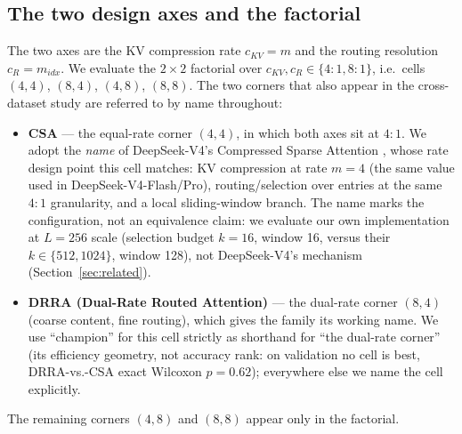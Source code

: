 \subsection{The two design axes and the factorial}
\label{sec:factorial}
The two axes are the KV compression rate $c_{KV} = m$ and the routing
resolution $c_R = m_{idx}$. We evaluate the $2 \times 2$ factorial over
$c_{KV}, c_R \in \{4{:}1, 8{:}1\}$, i.e.\ cells $(4,4)$, $(8,4)$, $(4,8)$,
$(8,8)$. The two corners that also appear in the cross-dataset study are
referred to by name throughout:
\begin{itemize}
  \item \textbf{CSA} --- the equal-rate corner $(4,4)$, in which both axes
        sit at $4{:}1$. We adopt the \emph{name} of DeepSeek-V4's Compressed
        Sparse Attention \citep{deepseekv4_2026}, whose rate design point
        this cell matches: KV compression at rate $m{=}4$ (the same value used
        in DeepSeek-V4-Flash/Pro), routing/selection over entries at the
        same $4{:}1$ granularity, and a local sliding-window branch. The
        name marks the configuration, not an equivalence claim: we evaluate
        our own implementation at $L{=}256$ scale (selection budget
        $k{=}16$, window 16, versus their $k{\in}\{512, 1024\}$, window
        128), not DeepSeek-V4's mechanism (Section~\ref{sec:related}).
  \item \textbf{DRRA (Dual-Rate Routed Attention)} --- the dual-rate corner
        $(8,4)$ (coarse content, fine routing), which gives the family its
        working name. We use ``champion'' for this cell strictly as shorthand for
        ``the dual-rate corner'' (its efficiency geometry, not accuracy rank: on validation
        no cell is best, DRRA-vs.-CSA exact Wilcoxon $p = 0.62$); everywhere else we name
        the cell explicitly.
\end{itemize}
The remaining corners $(4,8)$ and $(8,8)$ appear only in the factorial.

